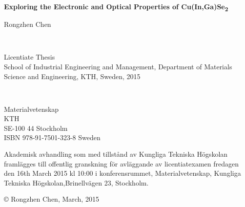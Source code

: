 \documentclass[a4paper, 12pt, titlepage,oneside,drop]{kthesis}
\begin{document}
\setcounter{page}{1}

\begin{center}




  \vspace{5 cm}





  \vspace{12pt}
  {\LARGE{\textbf{Exploring the Electronic and Optical Properties of Cu(In,Ga)Se\textsubscript{2} }}}
  \vspace{12pt}

  \vspace{5 cm}

  {\large{Rongzhen Chen}}


  \vfill 

  \ 

  \large{Licentiate Thesis}
  \\
  \large{School of Industrial Engineering and Management,
  Department of Materials Science and Engineering,
  KTH, Sweden, 2015}

\end{center}

 \thispagestyle{empty}



\newpage
\setcounter{page}{2}
\thispagestyle{empty}
\
\vfill

\begin{flushright}
 Materialvetenskap\\
 KTH\\
\hfill SE-100 44 Stockholm\\ ISBN 978-91-7501-323-8  \hfill
Sweden\\
\end{flushright}


\vspace{5mm}

Akademisk avhandling som med tillstånd av Kungliga Tekniska
Högskolan framlägges till offentlig granskning för avläggande av
licentiatexamen fredagen den 16th March 2015 kl 10:00 i konferensrummet, Materialvetenskap, Kungliga Tekniska
Högskolan,\linebreak Brinellvägen 23, Stockholm.

\vspace{5mm}

\copyright \hspace{3pt} {Rongzhen Chen, March, 2015}
\end{document}
